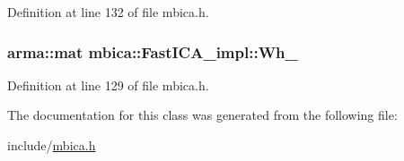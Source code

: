 Definition at line 132 of file mbica.h.

\hypertarget{classmbica_1_1_fast_i_c_a__impl_a11bb92ab13c2a5d86ee57368a0c6f37b}{
\subsubsection[{Wh\_\-}]{\setlength{\rightskip}{0pt plus 5cm}arma::mat {\bf mbica::FastICA\_\-impl::Wh\_\-}}}
\label{classmbica_1_1_fast_i_c_a__impl_a11bb92ab13c2a5d86ee57368a0c6f37b}


Definition at line 129 of file mbica.h.



The documentation for this class was generated from the following file:\begin{DoxyCompactItemize}
\item 
include/\hyperlink{mbica_8h}{mbica.h}\end{DoxyCompactItemize}
